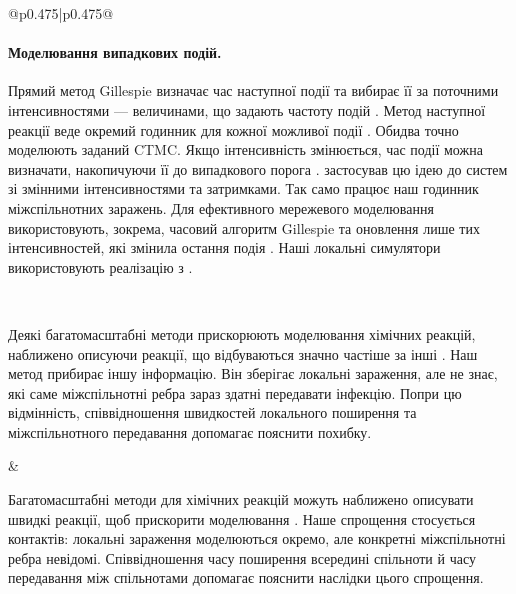 ﻿\documentclass[11pt]{article}
\begin{document}
\begin{longtable}{@{}p{0.475\textwidth}|p{0.475\textwidth}@{}}
\begin{minipage}[t]{\linewidth}
\paragraph{Моделювання випадкових подій.}
Прямий метод Gillespie визначає час наступної події та вибирає її за поточними інтенсивностями --- величинами, що задають частоту подій \citep{gillespie1977exact}. Метод наступної реакції веде окремий годинник для кожної можливої події \citep{gibson2000}. Обидва точно моделюють заданий CTMC. Якщо інтенсивність змінюється, час події можна визначати, накопичуючи її до випадкового порога \citep{ethier1986}. \citet{anderson2007} застосував цю ідею до систем зі змінними інтенсивностями та затримками. Так само працює наш годинник міжспільнотних заражень. Для ефективного мережевого моделювання використовують, зокрема, часовий алгоритм Gillespie та оновлення лише тих інтенсивностей, які змінила остання подія \citep{vestergaard2015,kuryliak2025simulating}. Наші локальні симулятори використовують реалізацію з \citet{kuryliak2025simulating}.
\end{minipage} \\[5mm]
\begin{minipage}[t]{\linewidth}
Деякі багатомасштабні методи прискорюють моделювання хімічних реакцій, наближено описуючи реакції, що відбуваються значно частіше за інші \citep{haseltine2002,cao2005slow}. Наш метод прибирає іншу інформацію. Він зберігає локальні зараження, але не знає, які саме міжспільнотні ребра зараз здатні передавати інфекцію. Попри цю відмінність, співвідношення швидкостей локального поширення та міжспільнотного передавання допомагає пояснити похибку.
\end{minipage} &
\begin{minipage}[t]{\linewidth}
Багатомасштабні методи для хімічних реакцій можуть наближено описувати швидкі реакції, щоб прискорити моделювання \citep{haseltine2002,cao2005slow}. Наше спрощення стосується контактів: локальні зараження моделюються окремо, але конкретні міжспільнотні ребра невідомі. Співвідношення часу поширення всередині спільноти й часу передавання між спільнотами допомагає пояснити наслідки цього спрощення.
\end{minipage} \\[5mm]
\begin{minipage}[t]{\linewidth}

\end{minipage}
\end{longtable}
\end{document}
